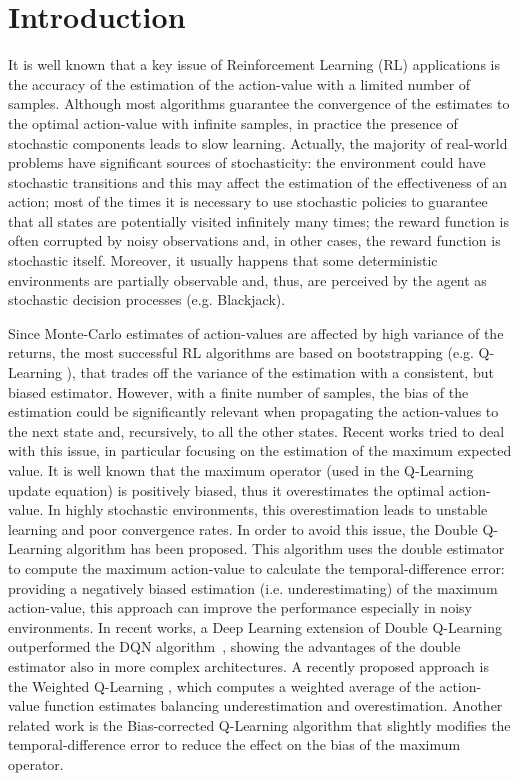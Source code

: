 \documentclass[conference]{IEEEtran}
\begin{document}
\section{Introduction}
It is well known that a key issue of Reinforcement Learning (RL) applications is the accuracy of the estimation of the action-value with a limited number of samples. Although most algorithms guarantee the convergence of the estimates to the optimal action-value with infinite samples, in practice the presence of stochastic components leads to slow learning. Actually, the majority of real-world problems have significant sources of stochasticity: the environment could have stochastic transitions and this may affect the estimation of the effectiveness of an action; most of the times it is necessary to use stochastic policies to guarantee that all states are potentially visited infinitely many times; the reward function is often corrupted by noisy observations and, in other cases, the reward function is stochastic itself. Moreover, it usually happens that some deterministic environments are partially observable and, thus, are perceived by the agent as stochastic decision processes (e.g. Blackjack).

Since Monte-Carlo estimates of action-values are affected by high variance of the returns, the most successful RL algorithms are based on bootstrapping (e.g. Q-Learning \cite{watkins1992q}), that trades off the variance of the estimation with a consistent, but biased estimator. However, with a finite number of samples, the bias of the estimation could be significantly relevant when propagating the action-values to the next state and, recursively, to all the other states. Recent works tried to deal with this issue, in particular focusing on the estimation of the maximum expected value. 
It is well known \cite{smith2006optimizer, van2004rational} that the maximum operator (used in the Q-Learning update equation) is positively biased, thus it overestimates the optimal action-value. In highly stochastic environments, this overestimation leads to unstable learning and poor convergence rates. In order to avoid this issue, the Double Q-Learning algorithm \cite{van2010double} has been proposed. This algorithm uses the double estimator \cite{van2013estimating} to compute the maximum action-value to calculate the temporal-difference error: providing a negatively biased estimation (i.e. underestimating) of the maximum action-value, this approach can improve the performance especially in noisy environments. In recent works, a Deep Learning extension of Double Q-Learning~\cite{van2016deep} outperformed the DQN algorithm~\cite{mnih2015human}, showing the advantages of the double estimator also in more complex architectures.
A recently proposed approach is the Weighted Q-Learning \cite{d2016estimating}, which computes a weighted average of the action-value function estimates balancing underestimation and overestimation. Another related work is the Bias-corrected Q-Learning algorithm \cite{lee2013bias} that slightly modifies the temporal-difference error to reduce the effect on the bias of the maximum operator.
\end{document}
